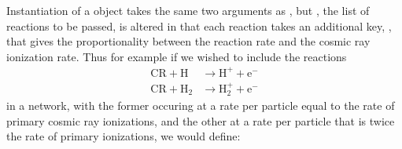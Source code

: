 \documentclass[letterpaper,10pt,english]{sphinxmanual}
\begin{document}
Instantiation of a  object takes the same two
arguments as {\hyperref[chemistry:ssssec\string-reaction\string-matrix]{}}, but , the
list of reactions to be passed, is altered in that each reaction takes
an additional key, , that gives the proportionality between
the reaction rate and the cosmic ray ionization rate. Thus for example
if we wished to include the reactions
\begin{equation*}
\begin{split}\mathrm{CR} + \mathrm{H} & \rightarrow \mathrm{H}^+ +
\mathrm{e}^- \\
\mathrm{CR} + \mathrm{H}_2 & \rightarrow \mathrm{H}_2^+ +
\mathrm{e}^-\end{split}
\end{equation*}
in a network, with the former occuring at a rate per particle equal to
the rate of primary cosmic ray ionizations, and the other at a rate
per particle that is twice the rate of primary ionizations, we would
define:
\end{document}

